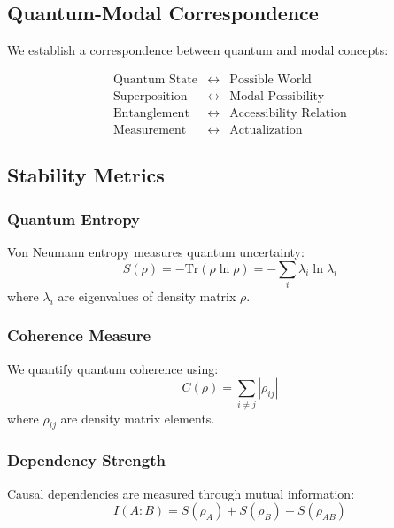 \subsection{Quantum-Modal Correspondence}
We establish a correspondence between quantum and modal concepts:

\begin{equation}
    \begin{array}{rcl}
        \text{Quantum State} & \leftrightarrow & \text{Possible World} \\
        \text{Superposition} & \leftrightarrow & \text{Modal Possibility} \\
        \text{Entanglement} & \leftrightarrow & \text{Accessibility Relation} \\
        \text{Measurement} & \leftrightarrow & \text{Actualization}
    \end{array}
\end{equation}

\subsection{Stability Metrics}
\subsubsection{Quantum Entropy}
Von Neumann entropy measures quantum uncertainty:
\begin{equation}
    S(\rho) = -\text{Tr}(\rho \ln \rho) = -\sum_i \lambda_i \ln \lambda_i
\end{equation}
where $\lambda_i$ are eigenvalues of density matrix $\rho$.

\subsubsection{Coherence Measure}
We quantify quantum coherence using:
\begin{equation}
    C(\rho) = \sum_{i\neq j} |\rho_{ij}|
\end{equation}
where $\rho_{ij}$ are density matrix elements.

\subsubsection{Dependency Strength}
Causal dependencies are measured through mutual information:
\begin{equation}
    I(A:B) = S(\rho_A) + S(\rho_B) - S(\rho_{AB})
\end{equation}

